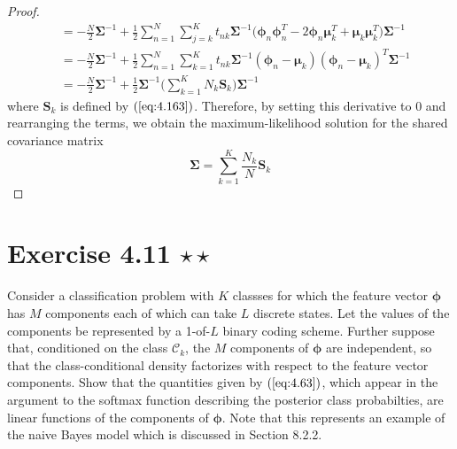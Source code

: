 \begin{proof}
\begin{align*}
        &= -\frac{N}{2} \mathbf{\Sigma}^{-1}
        + \frac{1}{2} \sum_{n=1}^{N} \sum_{j=k}^{K} t_{nk} \mathbf{\Sigma}^{-1}
        \big(\bm{\phi}_n\bm{\phi}_n^T - 2\bm{\phi}_n\bm{\mu}_k^T + \bm{\mu}_k\bm{\mu}_k^T\big) 
        \mathbf{\Sigma}^{-1} \\
        &= -\frac{N}{2} \mathbf{\Sigma}^{-1} 
        + \frac{1}{2} \sum_{n=1}^{N} \sum_{k=1}^{K} t_{nk} \mathbf{\Sigma}^{-1}
        (\bm{\phi}_n - \bm{\mu}_k)(\bm{\phi}_n - \bm{\mu}_k)^T \mathbf{\Sigma}^{-1} \\
        &= -\frac{N}{2} \mathbf{\Sigma}^{-1} 
        + \frac{1}{2} \mathbf{\Sigma}^{-1} 
        \bigg(\sum_{k=1}^{K} N_k\mathbf{S}_k\bigg) \mathbf{\Sigma}^{-1}
    \end{align*}
    where $\mathbf{S}_k$ is defined by $(\ref{eq:4.163})$. Therefore, by setting
    this derivative to 0 and rearranging the terms,
    we obtain the maximum-likelihood solution for the
    shared covariance matrix
    \[
        \mathbf{\Sigma} = \sum_{k=1}^{K} \frac{N_k}{N} \mathbf{S}_k \tag{4.162}
    \] 
\end{proof}

\section*{Exercise 4.11 $\star \star$}
Consider a classification problem with $K$ classses for which the feature
vector $\mathbf{\phi}$ has $M$ components each of which can take $L$ discrete
states. Let the values of the components be represented by a 1-of-$L$ binary coding scheme.
Further suppose that, conditioned on the class $\mathcal{C}_k$, the $M$ components
of $\bm{\phi}$ are independent, so that the class-conditional density factorizes
with respect to the feature vector components. Show that the quantities given by
$(\ref{eq:4.63})$, which appear in the argument to the softmax function
describing the posterior class probabilties, are linear functions of the components
of $\bm{\phi}$. Note that this represents an example of the naive Bayes model
which is discussed in Section 8.2.2.

\vspace{1em}

